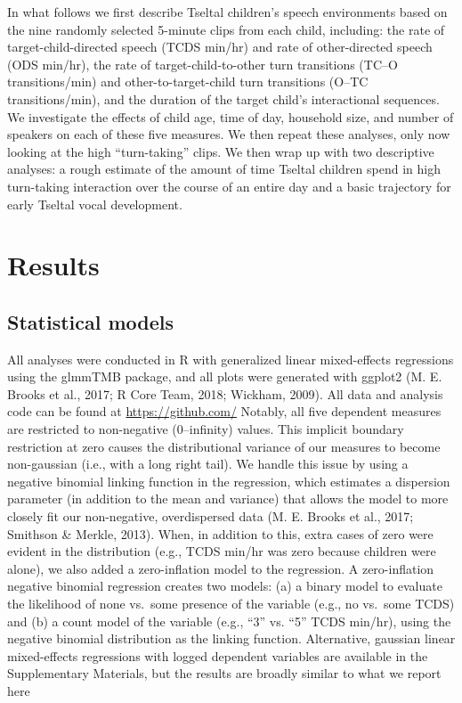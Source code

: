 \documentclass[floatsintext,man]{apa6}
\theoremstyle{definition}
\theoremstyle{definition}
\theoremstyle{definition}
\theoremstyle{remark}
\begin{document}
In what follows we first describe Tseltal children's speech environments
based on the nine randomly selected 5-minute clips from each child,
including: the rate of target-child-directed speech (TCDS min/hr) and
rate of other-directed speech (ODS min/hr), the rate of
target-child-to-other turn transitions (TC--O transitions/min) and
other-to-target-child turn transitions (O--TC transitions/min), and the
duration of the target child's interactional sequences. We investigate
the effects of child age, time of day, household size, and number of
speakers on each of these five measures. We then repeat these analyses,
only now looking at the high \enquote{turn-taking} clips. We then wrap
up with two descriptive analyses: a rough estimate of the amount of time
Tseltal children spend in high turn-taking interaction over the course
of an entire day and a basic trajectory for early Tseltal vocal
development.

\section{Results}\label{results}

\subsection{Statistical models}\label{statistical-models}

All analyses were conducted in R with generalized linear mixed-effects
regressions using the glmmTMB package, and all plots were generated with
ggplot2 (M. E. Brooks et al., 2017; R Core Team, 2018; Wickham, 2009).
All data and analysis code can be found at \url{https://github.com/}
Notably, all five dependent measures are restricted to non-negative
(0--infinity) values. This implicit boundary restriction at zero causes
the distributional variance of our measures to become non-gaussian
(i.e., with a long right tail). We handle this issue by using a negative
binomial linking function in the regression, which estimates a
dispersion parameter (in addition to the mean and variance) that allows
the model to more closely fit our non-negative, overdispersed data (M.
E. Brooks et al., 2017; Smithson \& Merkle, 2013). When, in addition to
this, extra cases of zero were evident in the distribution (e.g., TCDS
min/hr was zero because children were alone), we also added a
zero-inflation model to the regression. A zero-inflation negative
binomial regression creates two models: (a) a binary model to evaluate
the likelihood of none vs.~some presence of the variable (e.g., no
vs.~some TCDS) and (b) a count model of the variable (e.g., \enquote{3}
vs. \enquote{5} TCDS min/hr), using the negative binomial distribution
as the linking function. Alternative, gaussian linear mixed-effects
regressions with logged dependent variables are available in the
Supplementary Materials, but the results are broadly similar to what we
report here
\end{document}
